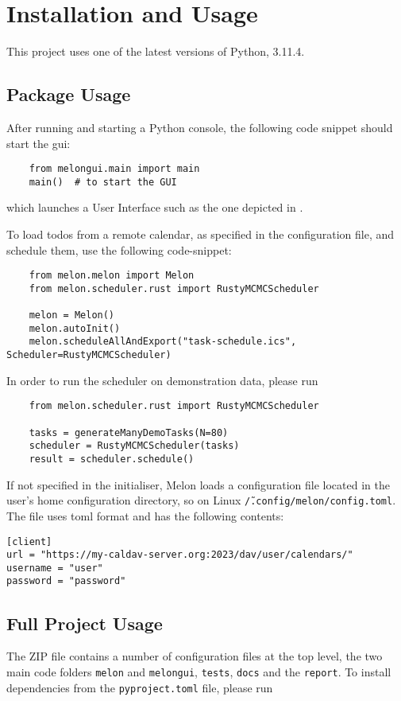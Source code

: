 \section{Installation and Usage}
This project uses one of the latest versions of Python, 3.11.4.

\subsection{Package Usage}
After running  and starting a Python console, the following code snippet should start the \gls{gui}:

\begin{verbatim}
    from melongui.main import main
    main()  # to start the GUI
  \end{verbatim}

which launches a User Interface such as the one depicted in .

To load todos from a remote calendar, as specified in the configuration file, and schedule them, use the following code-snippet:
\begin{verbatim}
    from melon.melon import Melon
    from melon.scheduler.rust import RustyMCMCScheduler

    melon = Melon()
    melon.autoInit()
    melon.scheduleAllAndExport("task-schedule.ics", Scheduler=RustyMCMCScheduler)
  \end{verbatim}

In order to run the scheduler on demonstration data, please run
\begin{verbatim}
    from melon.scheduler.rust import RustyMCMCScheduler

    tasks = generateManyDemoTasks(N=80)
    scheduler = RustyMCMCScheduler(tasks)
    result = scheduler.schedule()
  \end{verbatim}

If not specified in the initialiser, Melon loads a configuration file located in the user's home configuration directory, so on Linux \texttt{\~/.config/melon/config.toml}.
The file uses \gls{toml} format and has the following contents:
\begin{verbatim}
[client]
url = "https://my-caldav-server.org:2023/dav/user/calendars/"
username = "user"
password = "password"
  \end{verbatim}

\subsection{Full Project Usage}
The ZIP file contains a number of configuration files at the top level, the two main code folders \texttt{melon} and \texttt{melongui}, \texttt{tests}, \texttt{docs} and the \texttt{report}.
To install dependencies from the \texttt{pyproject.toml} file, please run

